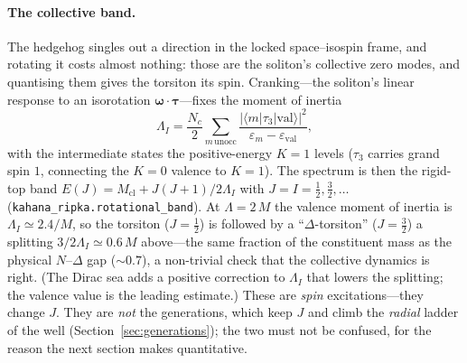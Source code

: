 \paragraph{The collective band.} The hedgehog singles out a direction in the locked space--isospin
frame, and rotating it costs almost nothing: those are the soliton's collective zero modes, and
quantising them gives the torsiton its spin. Cranking---the soliton's linear response to an
isorotation $\boldsymbol\omega\!\cdot\!\boldsymbol\tau$---fixes the moment of inertia
\begin{equation}
  \Lambda_I = \frac{N_c}{2}\sum_{m\,\mathrm{unocc}}
  \frac{|\langle m|\tau_3|\mathrm{val}\rangle|^2}{\varepsilon_m-\varepsilon_\mathrm{val}},
  \label{eq:moi}
\end{equation}
with the intermediate states the positive-energy $K{=}1$ levels ($\tau_3$ carries grand spin $1$,
connecting the $K{=}0$ valence to $K{=}1$). The spectrum is then the rigid-top band
$E(J)=M_\mathrm{cl}+J(J{+}1)/2\Lambda_I$ with $J=I=\tfrac12,\tfrac32,\dots$
(\texttt{kahana\_ripka.rotational\_band}). At $\Lambda=2\,M$ the valence moment of inertia is
$\Lambda_I\simeq2.4/M$, so the torsiton ($J{=}\tfrac12$) is followed by a ``$\Delta$-torsiton''
($J{=}\tfrac32$) a splitting $3/2\Lambda_I\simeq0.6\,M$ above---the same fraction of the constituent
mass as the physical $N$--$\Delta$ gap ($\sim0.7$), a non-trivial check that the collective dynamics
is right. (The Dirac sea adds a positive correction to $\Lambda_I$ that lowers the splitting; the
valence value is the leading estimate.) These are \emph{spin} excitations---they change $J$. They are
\emph{not} the generations, which keep $J$ and climb the \emph{radial} ladder of the well
(Section~\ref{sec:generations}); the two must not be confused, for the reason the next section makes
quantitative.


